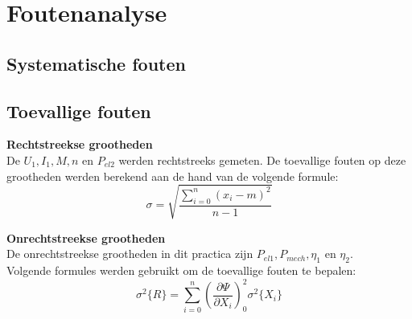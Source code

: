 \section{Foutenanalyse}
\subsection{Systematische fouten}

\subsection{Toevallige fouten}
\textbf{Rechtstreekse grootheden}\\
De $U_1,I_1,M,n$ en $P_{el2}$ werden rechtstreeks gemeten. De toevallige fouten
op deze grootheden werden berekend aan de hand van de volgende formule: 
\begin{equation}
    \sigma=\sqrt{\frac{\sum\limits_{i=0}^n(x_i-m)^2}{n-1}}  
\end{equation}

\noindent \textbf{Onrechtstreekse grootheden}\\
De onrechtstreekse grootheden in dit practica zijn $P_{el1},P_{mech},\eta_{1}$ en
$\eta_2$.\\
Volgende formules werden gebruikt om de toevallige fouten te bepalen:\\
\begin{equation}
    \sigma^2\{R\}=\sum\limits_{i=0}^n\left(\frac{\partial \Psi}{\partial X_i}\right)_0^2 \sigma ^2 \{X_i\}
\end{equation}